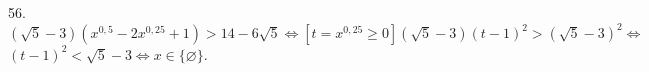 56. $(\sqrt{5}-3)(x^{0,5}-2x^{0,25}+1)>14-6\sqrt{5}\Leftrightarrow[t=x^{0,25}\geqslant0](\sqrt{5}-3)(t-1)^2>(\sqrt{5}-3)^2\Leftrightarrow$\\$ (t-1)^2<\sqrt{5}-3
\Leftrightarrow x\in\{\varnothing\}.$\\
